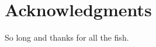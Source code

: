 



\bigskip

\begingroup
\let\clearpage\relax
\let\cleardoublepage\relax
\let\cleardoublepage\relax
\chapter*{Acknowledgments}

So long and thanks for all the fish. 

\bigskip


\endgroup



